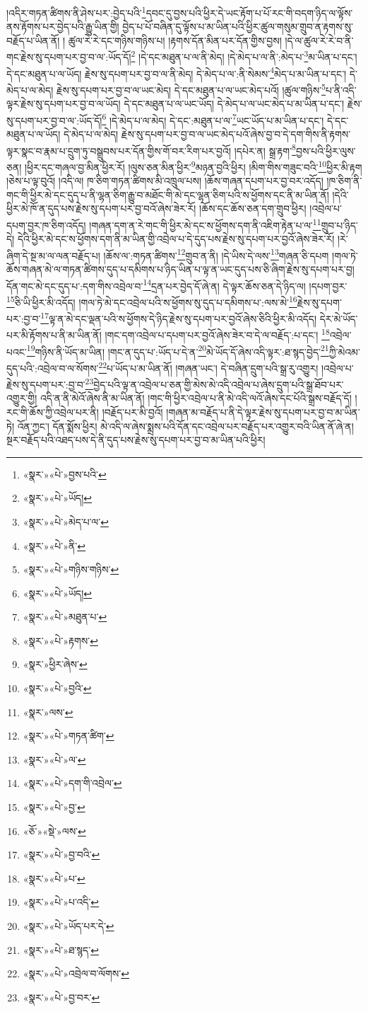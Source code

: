 །འདིར་གཏན་ཚིགས་ནི་ཤེས་པར་:བྱེད་པའི་\footnote{«སྣར་»«པེ་»བྱས་པའི་}དབང་དུ་བྱས་པའི་ཕྱིར་དེ་ཡང་རྟོག་པ་པོ་རང་གི་བདག་ཉིད་ལ་ལྟོས་ནས་རྟོགས་པར་བྱེད་པའི་རྒྱུ་ཡིན་གྱི། བྱེད་པ་པོ་བཞིན་དུ་ལྟོས་པ་མ་ཡིན་པའི་ཕྱིར་ཚུལ་གསུམ་གྲུབ་ན་རྟགས་སུ་བརྗོད་པ་ཡིན་ནོ། །
ཚུལ་རེ་རེ་དང་གཉིས་གཉིས་པ། །རྟགས་དོན་མིན་པར་དོན་གྱིས་བྱས། །དེ་ལ་ཚུལ་རེ་རེ་བ་ནི་གང་རྗེས་སུ་དཔག་པར་བྱ་བ་ལ་:ཡོད་དོ།\footnote{«སྣར་»«པེ་»ཡོད།} །དེ་དང་མཐུན་པ་ལ་ནི་མེད། །དེ་མེད་པ་ལ་ནི་:མེད་པ་\footnote{«སྣར་»«པེ་»མེད་པ་ལ་}མ་ཡིན་པ་དང་། དེ་དང་མཐུན་པ་ལ་ཡོད། རྗེས་སུ་དཔག་པར་བྱ་བ་ལ་ནི་མེད། དེ་མེད་པ་ལ་:ནི་སེམས་\footnote{«སྣར་»«པེ་»ནི་}མེད་པ་མ་ཡིན་པ་དང་། དེ་མེད་པ་ལ་མེད། རྗེས་སུ་དཔག་པར་བྱ་བ་ལ་ཡང་མེད། དེ་དང་མཐུན་པ་ལ་ཡང་མེད་པའོ། །ཚུལ་གཉིས་\footnote{«སྣར་»«པེ་»གཉིས་གཉིས་}པ་ནི་འདི་ལྟར་རྗེས་སུ་དཔག་པར་བྱ་བ་ལ་ཡོད། དེ་དང་མཐུན་པ་ལ་ཡང་ཡོད། དེ་མེད་པ་ལ་ཡང་མེད་པ་མ་ཡིན་པ་དང་། རྗེས་སུ་དཔག་པར་བྱ་བ་ལ་:ཡོད་དོ།\footnote{«སྣར་»«པེ་»ཡོད།} །དེ་མེད་པ་ལ་མེད། དེ་དང་:མཐུན་པ་ལ་\footnote{«སྣར་»«པེ་»མཐུན་པ་}ཡང་ཡོད་པ་མ་ཡིན་པ་དང་། དེ་དང་མཐུན་པ་ལ་ཡོད། དེ་མེད་པ་ལ་མེད། རྗེས་སུ་དཔག་པར་བྱ་བ་ལ་ཡང་མེད་པའོ་ཞེས་བྱ་བ་དེ་དག་གིས་ནི་རྟགས་ལྟར་སྣང་བ་རྣམ་པ་དྲུག་ཏུ་བསྒྲུབས་པར་དོན་གྱིས་གོ་བར་རིག་པར་བྱའོ། །དཔེར་ན། སྒྲ་རྟག་\footnote{«སྣར་»«པེ་»རྟགས་}བྱས་པའི་ཕྱིར་ལུས་ཅན། །ཕྱིར་དང་གཞལ་བྱ་མིན་ཕྱིར་རོ། །ལུས་ཅན་མིན་ཕྱིར་\footnote{«སྣར་»ཕྱིར་ཞེས་}མཉན་བྱའི་ཕྱིར། །མིག་གིས་གཟུང་བའི་\footnote{«སྣར་»«པེ་»བྱའི་}ཕྱིར་མི་རྟག །ཅེས་པ་ལྟ་བུའོ། །འདི་ལ། ཁ་ཅིག་གཏན་ཚིགས་མི་འཁྲུལ་པས། །ཆོས་གཞན་དཔག་པར་བྱ་བར་འདོད། །ཁ་ཅིག་ནི་གང་གི་ཕྱིར་མེ་དང་དུད་པ་ནི་ལྷན་ཅིག་རྒྱུ་བ་མཐོང་གི་མེ་དང་ལྷན་ཅིག་པའི་ས་ཕྱོགས་དང་ནི་མ་ཡིན་ནོ། །དེའི་ཕྱིར་མེ་ཁོ་ན་དུད་པས་རྗེས་སུ་དཔག་པར་བྱ་བའོ་ཞེས་ཟེར་རོ། །ཆོས་དང་ཆོས་ཅན་དག་གྲུབ་ཕྱིར། །འབྲེལ་པ་དཔག་བྱར་ཁ་ཅིག་འདོད། །གཞན་དག་ན་རེ་གང་གི་ཕྱིར་མེ་དང་ས་ཕྱོགས་དག་ནི་འཇིག་རྟེན་པ་ལ་\footnote{«སྣར་»ལས་}གྲུབ་པ་ཉིད་དེ། དེའི་ཕྱིར་མེ་དང་ས་ཕྱོགས་དག་ནི་མ་ཡིན་གྱི་འབྲེལ་པ་དེ་དུད་པས་རྗེས་སུ་དཔག་པར་བྱའོ་ཞེས་ཟེར་རོ། །རེ་ཞིག་དེ་སྔ་མ་ལ་ལན་བརྗོད་པ། །ཆོས་ལ་:གཏན་ཚིགས་\footnote{«སྣར་»«པེ་»གཏན་ཚིག་}གྲུབ་ན་ནི། །དེ་ཡིས་དེ་ལས་\footnote{«སྣར་»«པེ་»ལ་}གཞན་ཅི་དཔག །གལ་ཏེ་ཆོས་གཞན་མེ་ལ་གཏན་ཚིགས་དུད་པ་དམིགས་པ་ཉིད་ཡིན་པ་ལྟ་ན་ཡང་དུད་པས་ཅི་ཞིག་རྗེས་སུ་དཔག་པར་བྱ། དོན་གང་མེ་དང་དུད་པ་:དག་གིས་འབྲེལ་བ་\footnote{«སྣར་»«པེ་»དག་གི་འབྲེལ་}དྲན་པར་བྱེད་དོ་ཞེ་ན། དེ་ལྟར་ཆོས་ཅན་དེ་ཉིད་ལ། །དཔག་བྱར་\footnote{«སྣར་»«པེ་»བྱ་}ཅི་ཡི་ཕྱིར་མི་འདོད། །གལ་ཏེ་མེ་དང་འབྲེལ་པའི་ས་ཕྱོགས་སུ་དུད་པ་དམིགས་པ་:ལས་མེ་\footnote{«ཅོ་»«སྡེ་»ལས་}རྗེས་སུ་དཔག་པར་:བྱ་བ་\footnote{«སྣར་»«པེ་»བྱ་བའི་}ལྟ་ན་མེ་དང་ལྡན་པའི་ས་ཕྱོགས་དེ་ཉིད་རྗེས་སུ་དཔག་པར་བྱའོ་ཞེས་ཅིའི་ཕྱིར་མི་འདོད། དེར་མེ་ཡོད་པར་མི་རྟོགས་པ་ནི་མ་ཡིན་ནོ། །གང་དག་འབྲེལ་པ་དཔག་པར་བྱའོ་ཞེས་ཟེར་བ་དེ་ལ་བརྗོད་:པ་དང་། \footnote{«སྣར་»«པེ་»པ་}འབྲེལ་པའང་\footnote{«སྣར་»«པེ་»པ་འདི་}གཉིས་ནི་ཡོད་མ་ཡིན། །གང་ན་དུད་པ་:ཡོད་པ་དེ་ན་\footnote{«སྣར་»«པེ་»ཡོད་པར་དེ་}མེ་ཡོད་དོ་ཞེས་འདི་ལྟར་:ཐ་སྙད་བྱེད་\footnote{«སྣར་»«པེ་»ཐ་སྙད་}ཀྱི་མེའམ་དུད་པའི་:འབྲེལ་བ་ལ་སོགས་\footnote{«སྣར་»«པེ་»འབྲེལ་བ་ལོགས་}པ་ཡོད་པ་མ་ཡིན་ནོ། །གཞན་ཡང་། དེ་བཞིན་དྲུག་པའི་སྒྲ་རུ་འགྱུར། །འབྲེལ་པ་རྗེས་སུ་དཔག་པར་:བྱ་བ་\footnote{«སྣར་»«པེ་»བྱ་བར་}བྱེད་པའི་ལྟ་ན་འབྲེལ་པ་ཅན་གྱི་མེས་མེ་འདི་འབྲེལ་པ་ཞེས་དྲུག་པའི་སྒྲ་ཐོབ་པར་འགྱུར་གྱི། འདི་ན་ནི་མེའོ་ཞེས་ནི་མ་ཡིན་ནོ། །གང་གི་ཕྱིར་འབྲེལ་པ་ནི་མེ་འདི་ལའོ་ཞེས་དང་པོའི་སྒྲས་བརྗོད་དོ། །རང་གི་ཆོས་ཀྱི་འབྲེལ་པར་ནི། །བརྗོད་པར་མི་བྱའོ། །གཞན་མ་བརྗོད་པ་ནི་དེ་ལྟར་རྗེས་སུ་དཔག་པར་བྱ་བ་མ་ཡིན་ཏེ། འོན་ཀྱང་། དོན་སྨོས་ཕྱིར། མེ་འདི་ལ་ཞེས་སྨྲས་པའི་དོན་དང་འབྲེལ་པར་བརྗོད་པར་འགྱུར་བའི་ཡིན་ནོ་ཞེ་ན། སྔར་བརྗོད་པའི་འཐད་པས་དེ་ནི་དུད་པས་རྗེས་སུ་དཔག་པར་བྱ་བ་མ་ཡིན་པའི་ཕྱིར། 